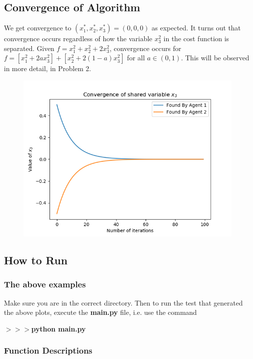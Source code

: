 \documentclass[12pt]{article}
\begin{document}
\subsection*{Convergence of Algorithm}

We get convergence to $(x_1^*,x_2^*,x_3^*)=(0,0,0)$ as expected. It turns out that convergence occurs regardless of how the variable $x_3^2$ in the cost function is separated. Given $f=x_1^2+x_2^2+2x_3^2$, convergence occurs for $f=[x_1^2+2ax_3^2]+[x_2^2+2(1-a)x_3^2]$ for all $a\in(0,1)$. This will be observed in more detail, in Problem 2.

\begin{figure}[H]
	\includegraphics[scale=1]{Problem1-Convergence.png}
\end{figure}

\subsection*{How to Run}

\subsubsection*{The above examples}

Make sure you are in the correct directory. Then to run the test that generated the above plots, execute the \textbf{main.py} file, i.e. use the command

\noindent \textbf{$>>>$python main.py}

\subsubsection*{Function Descriptions}
\end{document}
